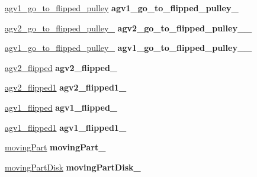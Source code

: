 \begin{DoxyCompactItemize}
\item 
\mbox{\label{classGantryControl_aed1d16b941e351543994d7eb2996ca2b}} 
\hyperlink{structPresetLocation}{agv1\+\_\+go\+\_\+to\+\_\+flipped\+\_\+pulley} {\bfseries agv1\+\_\+go\+\_\+to\+\_\+flipped\+\_\+pulley\+\_\+}
\item 
\mbox{\label{classGantryControl_a3e96c5381bb8abd14d254f4eb76c9e4d}} 
\hyperlink{structPresetLocation}{agv2\+\_\+go\+\_\+to\+\_\+flipped\+\_\+pulley\+\_} {\bfseries agv2\+\_\+go\+\_\+to\+\_\+flipped\+\_\+pulley\+\_\+\_\+}
\item 
\mbox{\label{classGantryControl_afed6f06331df5a0d255310889128f91b}} 
\hyperlink{structPresetLocation}{agv1\+\_\+go\+\_\+to\+\_\+flipped\+\_\+pulley\+\_} {\bfseries agv1\+\_\+go\+\_\+to\+\_\+flipped\+\_\+pulley\+\_\+\_\+}
\item 
\mbox{\label{classGantryControl_a17f37a7d0d8461308e05cbdfc0b2a3a7}} 
\hyperlink{structPresetLocation}{agv2\+\_\+flipped} {\bfseries agv2\+\_\+flipped\+\_\+}
\item 
\mbox{\label{classGantryControl_a2cc6e52ae5918786aa74a32fddb0b2e2}} 
\hyperlink{structPresetLocation}{agv2\+\_\+flipped1} {\bfseries agv2\+\_\+flipped1\+\_\+}
\item 
\mbox{\label{classGantryControl_ae5b990d158f990b17c246c0df72a9aeb}} 
\hyperlink{structPresetLocation}{agv1\+\_\+flipped} {\bfseries agv1\+\_\+flipped\+\_\+}
\item 
\mbox{\label{classGantryControl_a1087ca991e502355d4fdef0c6bff2126}} 
\hyperlink{structPresetLocation}{agv1\+\_\+flipped1} {\bfseries agv1\+\_\+flipped1\+\_\+}
\item 
\mbox{\label{classGantryControl_a895f996a789ec8afba7e638443e03147}} 
\hyperlink{structPresetLocation}{moving\+Part} {\bfseries moving\+Part\+\_\+}
\item 
\mbox{\label{classGantryControl_a53884771eb5454c0b515e06406d6b738}} 
\hyperlink{structPresetLocation}{moving\+Part\+Disk} {\bfseries moving\+Part\+Disk\+\_\+}

\end{DoxyCompactItemize}

